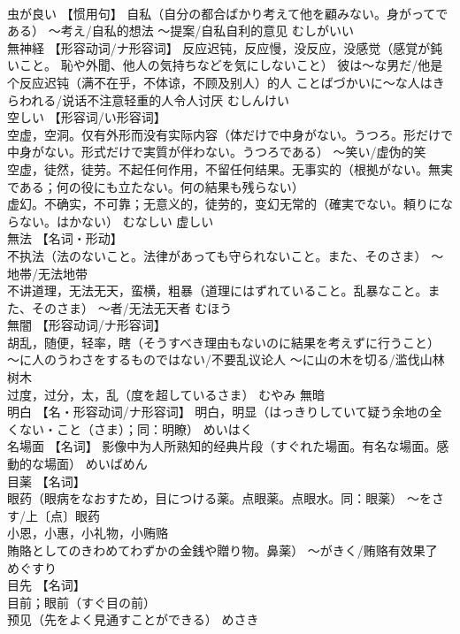 \documentclass[8pt]{extreport}
\begin{document}
\begin{CJK}{UTF8}{min}
\\	虫が良い	【惯用句】 自私（自分の都合ばかり考えて他を顧みない。身がってである） ～考え/自私的想法 ～提案/自私自利的意见	むしがいい	
\\	無神経	【形容动词/ナ形容词】 反应迟钝，反应慢，没反应，没感觉（感覚が鈍いこと。 恥や外聞、他人の気持ちなどを気にしないこと） 彼は～な男だ/他是个反应迟钝（满不在乎，不体谅，不顾及别人）的人 ことばづかいに～な人はきらわれる/说话不注意轻重的人令人讨厌	むしんけい	
\\	空しい	【形容词/い形容词】 
\\	空虚，空洞。仅有外形而没有实际内容（体だけで中身がない。うつろ。形だけで中身がない。形式だけで実質が伴わない。うつろである） ～笑い/虚伪的笑 
\\	空虚，徒然，徒劳。不起任何作用，不留任何结果。无事实的（根拠がない。無実である；何の役にも立たない。何の結果も残らない） 
\\	虚幻。不确实，不可靠；无意义的，徒劳的，变幻无常的（確実でない。頼りにならない。はかない）	むなしい	虚しい
\\	無法	【名词・形动】 
\\	不执法（法のないこと。法律があっても守られないこと。また、そのさま） ～地帯/无法地带 
\\	不讲道理，无法无天，蛮横，粗暴（道理にはずれていること。乱暴なこと。また、そのさま） ～者/无法无天者	むほう	
\\	無闇	【形容动词/ナ形容词】 
\\	胡乱，随便，轻率，瞎（そうすべき理由もないのに結果を考えずに行うこと） ～に人のうわさをするものではない/不要乱议论人 ～に山の木を切る/滥伐山林树木 
\\	过度，过分，太，乱（度を超しているさま）	むやみ	無暗
\\	明白	【名・形容动词/ナ形容词】 明白，明显（はっきりしていて疑う余地の全くない・こと（さま）；同：明瞭）	めいはく	
\\	名場面	【名词】 影像中为人所熟知的经典片段（すぐれた場面。有名な場面。感動的な場面）	めいばめん	
\\	目薬	【名词】 
\\	眼药（眼病をなおすため，目につける薬。点眼薬。点眼水。同：眼薬） ～をさす/上〔点〕眼药 
\\	小恩，小惠，小礼物，小贿赂
\\	賄賂としてのきわめてわずかの金銭や贈り物。鼻薬） ～がきく/贿赂有效果了	めぐすり	
\\	目先	【名词】 
\\	目前；眼前（すぐ目の前） 
\\	预见（先をよく見通すことができる）	めさき	

\end{CJK}
\end{document}
